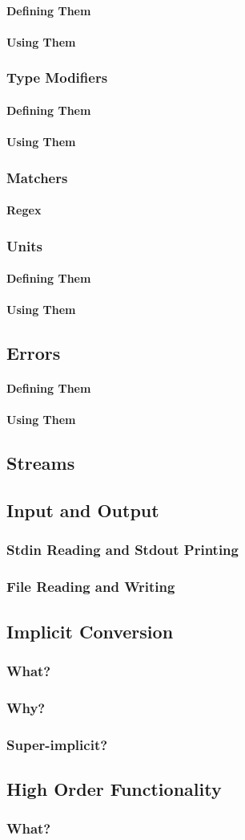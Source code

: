 \documentclass{article}
\newcommand{\ssecl}[1]{\subsection{#1}\label{ssec:#1}}
\newcommand{\sssecl}[1]{\subsubsection{#1}\label{sssec:#1}}
\begin{document}
\paragraph{Defining Them}

\paragraph{Using Them}

\sssecl{Type Modifiers}
\paragraph{Defining Them}

\paragraph{Using Them}

\sssecl{Matchers}
\paragraph{Regex} \label{par:Regex}

\sssecl{Units}
\paragraph{Defining Them}

\paragraph{Using Them}

\ssecl{Errors}
\paragraph{Defining Them}

\paragraph{Using Them}

\ssecl{Streams}
\ssecl{Input and Output}
\sssecl{Stdin Reading and Stdout Printing}

\sssecl{File Reading and Writing}

\ssecl{Implicit Conversion}
\sssecl{What?}

\sssecl{Why?}

\sssecl{Super-implicit?}

\ssecl{High Order Functionality}
\sssecl{What?}
\end{document}
